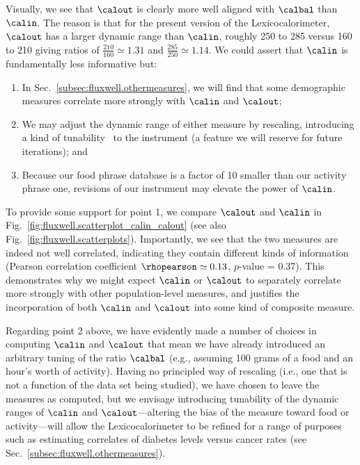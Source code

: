 Visually, we see that $\calout$ is clearly more well aligned
with $\calbal$ than $\calin$.
The reason is that for the present version
of the Lexicocalorimeter,
$\calout$ has a larger dynamic
range than $\calin$,
roughly 250 to 285 versus 160 to 210 
giving ratios of 
$\frac{210}{160} \simeq 1.31$
and
$\frac{285}{250} \simeq 1.14$.
We could assert that $\calin$ is fundamentally less 
informative but: 
\begin{enumerate}
\item 
  In Sec.~\ref{subsec:fluxwell.othermeasures},
  we will find that some demographic measures correlate
  more strongly with $\calin$ and $\calout$;
\item 
  We may adjust the dynamic range of either measure 
  by rescaling, introducing a kind of tunability~\cite{dodds2011e}
  to the instrument (a feature we will reserve for future
  iterations);
  and
\item 
  Because our food phrase database is 
  a factor of 10
  smaller than our activity phrase one,
  revisions of our instrument may elevate
  the power of $\calin$.
\end{enumerate}

To provide some support for point 1, 
we compare $\calout$ and $\calin$ in
Fig.~\ref{fig:fluxwell.scatterplot_calin_calout}
(see also Fig.~\ref{fig:fluxwell.scatterplots}).
Importantly, we see that the two measures are indeed
not well correlated, indicating they contain
different kinds of information
(Pearson correlation coefficient $\rhopearson \simeq 0.13$,
$p$-value = 0.37).
This demonstrates why we might expect 
$\calin$ or $\calout$ to separately correlate
more strongly with other population-level measures,
and justifies the incorporation of both $\calin$ and $\calout$
into some kind of composite measure.

Regarding point 2 above, we have evidently made
a number of choices in computing $\calin$ and $\calout$
that mean we have already introduced an arbitrary tuning
of the ratio $\calbal$
(e.g., assuming 100 grams of a food and an hour's worth of activity).
Having no principled way of rescaling (i.e., one that is not
a function of the data set being studied), 
we have chosen to leave the measures as computed,
but we envisage introducing tunability of the dynamic
ranges of $\calin$ and $\calout$---altering the bias of
the measure toward food or activity---will allow
the Lexicocalorimeter to be refined for 
a range of purposes such as estimating correlates of diabetes levels
versus cancer rates (see Sec.~\ref{subsec:fluxwell.othermeasures}).

